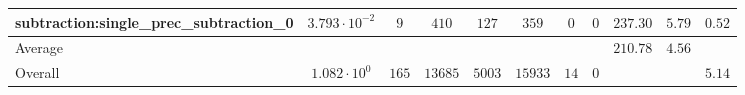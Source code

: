\begin{tabular}{|l|c|c|c|c|c|c|c|c|c|c|}
subtraction:single\_prec\_subtraction\_0         & $ 3.793 \cdot 10^{-2} $ & $ 9      $ & $ 410   $ & $ 127  $ & $ 359   $ & $ 0  $ & $ 0 $ & $ 237.30      $ & $ 5.79    $ & $ 0.52    $ \\
\hline
Average                                          & $                     $ & $        $ & $       $ & $      $ & $       $ & $    $ & $   $ & $ 210.78      $ & $ 4.56    $ & $         $ \\
\hline
Overall                                          & $ 1.082 \cdot 10^{0}  $ & $ 165    $ & $ 13685 $ & $ 5003 $ & $ 15933 $ & $ 14 $ & $ 0 $ & $             $ & $         $ & $ 5.14    $ \\
\hline
\end{tabular}
